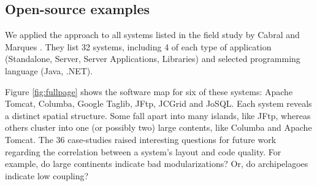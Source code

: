 \subsection{Open-source examples}

We applied the \SOCA approach to all systems listed in the field study by Cabral and Marques \cite{Cabr07a}. They list 32 systems, including 4 of each type of application (Standalone, Server, Server Applications, Libraries) and selected programming language (Java, .NET).  

Figure \ref{fig:fullpage} shows the software map for six of these systems: Apache Tomcat, Columba, Google Taglib, JFtp, JCGrid and JoSQL. Each system reveals a distinct spatial structure. Some fall apart into many islands, like JFtp, whereas others cluster into one (or possibly two) large contents, like Columba and Apache Tomcat. The 36 case-studies raised interesting questions for future work regarding the correlation between a system's layout and code quality. For example, do large continents indicate bad modularizations? Or, do archipelagoes indicate low coupling?



